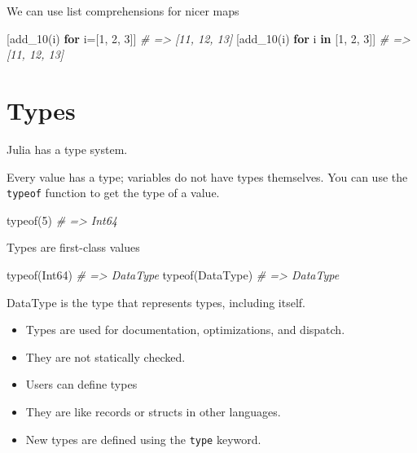 \documentclass[ignorenonframetext,]{beamer}
\newenvironment{Shaded}{}{}
\newcommand{\KeywordTok}[1]{\textcolor[rgb]{0.00,0.44,0.13}{\textbf{{#1}}}}
\newcommand{\DataTypeTok}[1]{\textcolor[rgb]{0.56,0.13,0.00}{{#1}}}
\newcommand{\FloatTok}[1]{\textcolor[rgb]{0.25,0.63,0.44}{{#1}}}
\newcommand{\CommentTok}[1]{\textcolor[rgb]{0.38,0.63,0.69}{\textit{{#1}}}}
\newcommand{\NormalTok}[1]{{#1}}
\begin{document}
\begin{frame}[fragile]{We can use list comprehensions for nicer maps}

\begin{Shaded}
\begin{Highlighting}[]
\NormalTok{[add_10(i) }\KeywordTok{for} \NormalTok{i=[}\FloatTok{1}\NormalTok{, }\FloatTok{2}\NormalTok{, }\FloatTok{3}\NormalTok{]] }\CommentTok{# => [11, 12, 13]}
\NormalTok{[add_10(i) }\KeywordTok{for} \NormalTok{i }\KeywordTok{in} \NormalTok{[}\FloatTok{1}\NormalTok{, }\FloatTok{2}\NormalTok{, }\FloatTok{3}\NormalTok{]] }\CommentTok{# => [11, 12, 13]}
\end{Highlighting}
\end{Shaded}

\end{frame}

\section{Types}\label{types}

\begin{frame}[fragile]{Julia has a type system.}

Every value has a type; variables do not have types themselves. You can
use the \texttt{typeof} function to get the type of a value.

\begin{Shaded}
\begin{Highlighting}[]
\NormalTok{typeof(}\FloatTok{5}\NormalTok{) }\CommentTok{# => Int64}
\end{Highlighting}
\end{Shaded}

\end{frame}

\begin{frame}[fragile]{Types are first-class values}

\begin{Shaded}
\begin{Highlighting}[]
\NormalTok{typeof(}\DataTypeTok{Int64}\NormalTok{) }\CommentTok{# => DataType}
\NormalTok{typeof(DataType) }\CommentTok{# => DataType}
\end{Highlighting}
\end{Shaded}

\end{frame}

\begin{frame}[fragile]{DataType is the type that represents types,
including itself.}

\begin{itemize}
\item
  Types are used for documentation, optimizations, and dispatch.
\item
  They are not statically checked.
\item
  Users can define types
\item
  They are like records or structs in other languages.
\item
  New types are defined using the \texttt{type} keyword.
\end{itemize}

\end{frame}
\end{document}

